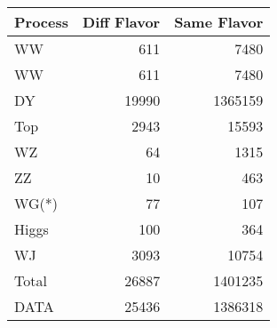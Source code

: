 \begin{table}[ht]
	\centering
\begin{tabular}{lrr}

Process &  Diff Flavor &  Same Flavor \\
		\hline
     WW &          611 &         7480 \\
     WW &          611 &         7480 \\
     DY &        19990 &      1365159 \\
    Top &         2943 &        15593 \\
     WZ &           64 &         1315 \\
     ZZ &           10 &          463 \\
  WG(*) &           77 &          107 \\
  Higgs &          100 &          364 \\
     WJ &         3093 &        10754 \\
\hline
  Total &        26887 &      1401235 \\
   DATA &        25436 &      1386318 \\


\end{tabular}

\end{table}